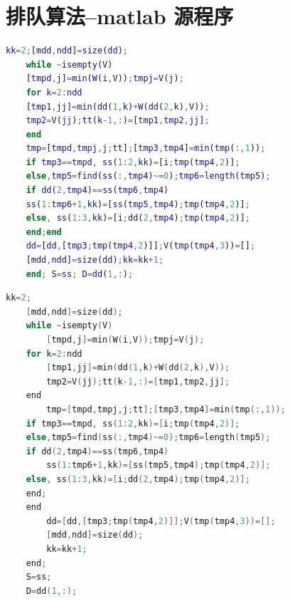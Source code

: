 \documentclass{cumcmthesis}
\begin{document}
	\newpage
	\appendix
	\section{排队算法--matlab 源程序}
	\begin{lstlisting}[language=matlab]
	kk=2;[mdd,ndd]=size(dd);
	while ~isempty(V)
	[tmpd,j]=min(W(i,V));tmpj=V(j);
	for k=2:ndd
	[tmp1,jj]=min(dd(1,k)+W(dd(2,k),V));
	tmp2=V(jj);tt(k-1,:)=[tmp1,tmp2,jj];
	end
	tmp=[tmpd,tmpj,j;tt];[tmp3,tmp4]=min(tmp(:,1));
	if tmp3==tmpd, ss(1:2,kk)=[i;tmp(tmp4,2)];
	else,tmp5=find(ss(:,tmp4)~=0);tmp6=length(tmp5);
	if dd(2,tmp4)==ss(tmp6,tmp4)
	ss(1:tmp6+1,kk)=[ss(tmp5,tmp4);tmp(tmp4,2)];
	else, ss(1:3,kk)=[i;dd(2,tmp4);tmp(tmp4,2)];
	end;end
	dd=[dd,[tmp3;tmp(tmp4,2)]];V(tmp(tmp4,3))=[];
	[mdd,ndd]=size(dd);kk=kk+1;
	end; S=ss; D=dd(1,:);
	 \end{lstlisting}
	\begin{lstlisting}[language=c]
	kk=2;
	[mdd,ndd]=size(dd);
	while ~isempty(V)
		[tmpd,j]=min(W(i,V));tmpj=V(j);
	for k=2:ndd
		[tmp1,jj]=min(dd(1,k)+W(dd(2,k),V));
		tmp2=V(jj);tt(k-1,:)=[tmp1,tmp2,jj];
	end
		tmp=[tmpd,tmpj,j;tt];[tmp3,tmp4]=min(tmp(:,1));
	if tmp3==tmpd, ss(1:2,kk)=[i;tmp(tmp4,2)];
	else,tmp5=find(ss(:,tmp4)~=0);tmp6=length(tmp5);
	if dd(2,tmp4)==ss(tmp6,tmp4)
		ss(1:tmp6+1,kk)=[ss(tmp5,tmp4);tmp(tmp4,2)];
	else, ss(1:3,kk)=[i;dd(2,tmp4);tmp(tmp4,2)];
	end;
	end
		dd=[dd,[tmp3;tmp(tmp4,2)]];V(tmp(tmp4,3))=[];
		[mdd,ndd]=size(dd);
		kk=kk+1;
	end;
	S=ss;
	D=dd(1,:);
	 \end{lstlisting}
	
	
	
\end{document}
